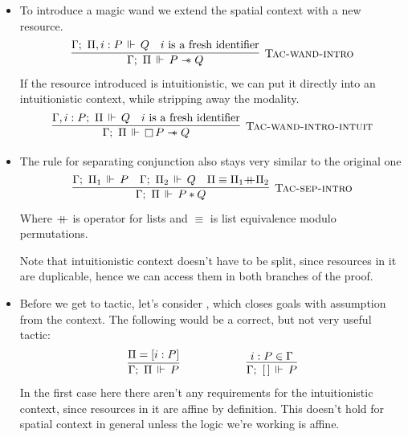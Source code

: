 \begin{itemize}
\item To introduce a magic wand we extend the spatial context with a new resource.
  \[\infer[\textsc{Tac-wand-intro}]
      {\entailsD P \wand Q}
      {\entails {\IntuD} {\SpatD, i : P} {Q} &
       i \text{ is a fresh identifier}}
  \]
  If the resource introduced is intuitionistic, we can put it directly into an intuitionistic context, while stripping away the modality.
  \[\infer[\textsc{Tac-wand-intro-intuit}]
      {\entailsD \intuit P \wand Q}
      {\entails {\IntuD, i : P} {\SpatD} {Q} &
       i \text{ is a fresh identifier}}
  \]
\item The rule for separating conjunction also stays very similar to the original one
  \[\infer[\textsc{Tac-sep-intro}]
      {\entailsD P * Q}
      {\entails {\IntuD} {\SpatD_1} P &
       \entails {\IntuD} {\SpatD_2} Q &
       \SpatD \equiv \SpatD_1 {+\hspace{-0.5em}+} \SpatD_2}
   \]
   Where \({+\hspace{-0.5em}+}\) is  operator for lists and \(\equiv\) is list equivalence modulo permutations.

   Note that intuitionistic context doesn't have to be split, since resources in it are duplicable, hence we can access them in both branches of the proof.
\item Before we get to  tactic, let's consider , which closes goals with assumption  from the context.
  The following would be a correct, but not very useful tactic:
  \begin{align*}
      \infer
        {\entailsD P}
        {\SpatD = [i : P]}
    & \hspace{5em}
    & \infer
        {\entails {\IntuD} {[\,]} P}
        {i : P \in \IntuD}
  \end{align*}
  In the first case here there aren't any requirements for the intuitionistic context, since resources in it are affine by definition.
  This doesn't hold for spatial context in general unless the logic we're working is affine.


\end{itemize}
